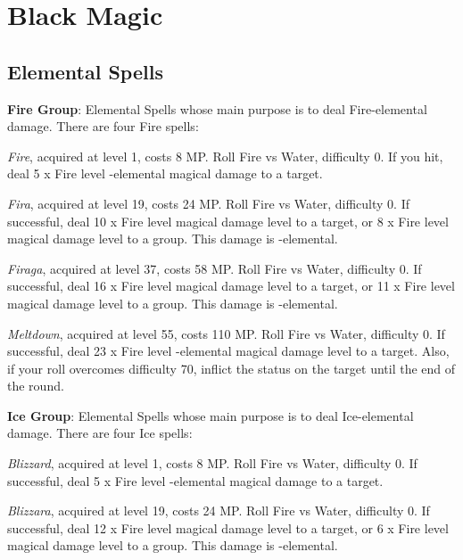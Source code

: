 \section{Black Magic}\label{sec:magic-black}
\begin{multicols}{2}
    \subsection{Elemental Spells}\label{subsec:black-elemental}
    
    \textbf{Fire Group}: Elemental Spells whose main purpose is to deal Fire-elemental damage. There are four Fire spells:

	\textit{Fire}, acquired at level 1, costs 8 MP\@. Roll Fire vs Water, difficulty 0. If you hit, deal 5 x Fire level -elemental magical damage to a target.
    
    \textit{Fira}, acquired at level 19, costs 24 MP\@. Roll Fire vs Water, difficulty 0. If successful, deal 10 x Fire level magical damage level to a target, or 8 x Fire level magical damage level to a group. This damage is -elemental.
    
    \textit{Firaga}, acquired at level 37, costs 58 MP\@. Roll Fire vs Water, difficulty 0. If successful, deal 16 x Fire level magical damage level to a target, or 11 x Fire level magical damage level to a group. This damage is -elemental.
    
    \textit{Meltdown}, acquired at level 55, costs 110 MP\@. Roll Fire vs Water, difficulty 0. If successful, deal 23 x Fire level -elemental magical damage level to a target. Also, if your roll overcomes difficulty 70, inflict the  status on the target until the end of the round.

    \ffcrystal[type=level,height=8pt]

    \textbf{Ice Group}: Elemental Spells whose main purpose is to deal Ice-elemental damage. There are four Ice spells:
    
    \textit{Blizzard}, acquired at level 1, costs 8 MP\@. Roll Fire vs Water, difficulty 0. If successful, deal 5 x Fire level -elemental magical damage to a target.
    
    \textit{Blizzara}, acquired at level 19, costs 24 MP\@. Roll Fire vs Water, difficulty 0. If successful, deal 12 x Fire level magical damage level to a target, or 6 x Fire level magical damage level to a group. This damage is -elemental.
    

\end{multicols}
